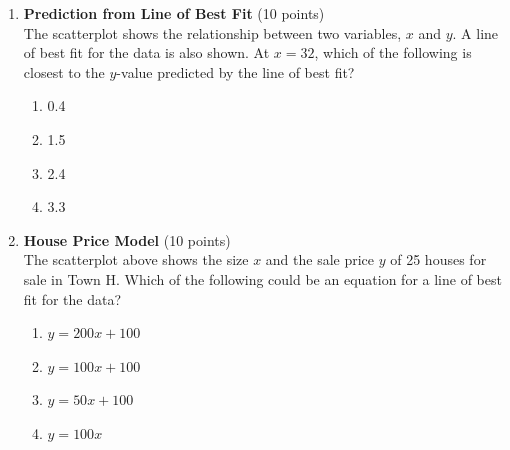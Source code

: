 \begin{enumerate}
  \item \textbf{Prediction from Line of Best Fit} (10 points)\\
  The scatterplot shows the relationship between two variables, $x$ and $y$. A line of best fit for the data is also shown.
  At $x=32$, which of the following is closest to the $y$-value predicted by the line of best fit?
  \begin{enumerate}[label=(\Alph*)]
    \item 0.4
    \item 1.5
    \item 2.4
    \item 3.3
  \end{enumerate}
  \begin{subanswer}
  \end{subanswer}

  \newpage

  \item \textbf{House Price Model} (10 points)\\
  The scatterplot above shows the size $x$ and the sale price $y$ of 25 houses for sale in Town H. Which of the following could be an equation for a line of best fit for the data?
  \begin{enumerate}[label=(\Alph*)]
    \item $y=200 x+100$
    \item $y=100 x+100$
    \item $y=50 x+100$
    \item $y=100 x$
  \end{enumerate}
  \begin{subanswer}
  \end{subanswer}

  \newpage


\end{enumerate}

